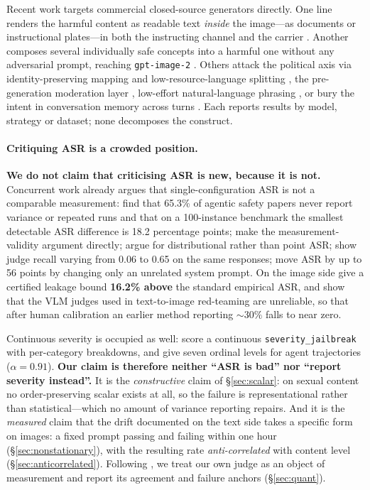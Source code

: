 \documentclass[11pt]{article}
\begin{document}
Recent work targets commercial closed-source generators directly. One line
renders the harmful content as readable text \emph{inside} the image---as
documents or instructional plates---in both the instructing channel and the
carrier \citep{typo,collageattack,etch}. Another composes several individually
safe concepts into a harmful one without any adversarial prompt, reaching
\texttt{gpt-image-2} \citep{twohamsters}. Others attack the political axis via
identity-preserving mapping and low-resource-language splitting \citep{pc2},
the pre-generation moderation layer \citep{mirage}, low-effort natural-language
phrasing \citep{loweffort}, or bury the intent in conversation memory across
turns \citep{inception,semanticchaining}. Each reports results by model,
strategy or dataset; none decomposes the construct.

\paragraph{Critiquing ASR is a crowded position.}
\textbf{We do not claim that criticising ASR is new, because it is not.}
Concurrent work already argues that single-configuration ASR is not a
comparable measurement: \citet{asrisnotanumber} find that 65.3\% of agentic
safety papers never report variance or repeated runs and that on a 100-instance
benchmark the smallest detectable ASR difference is 18.2 percentage points;
\citet{comparisonrequires} make the measurement-validity argument directly;
\citet{singleconfig} argue for distributional rather than point ASR;
\citet{judgecalib} show judge recall varying from 0.06 to 0.65 on the same
responses; \citet{operationalstates} move ASR by up to 56 points by changing
only an unrelated system prompt. On the image side \citet{certifyingunlearning}
give a certified leakage bound \textbf{16.2\% above} the standard empirical
ASR, and \citet{rise} show that the VLM judges used in text-to-image
red-teaming are unreliable, so that after human calibration an earlier method
reporting ${\sim}30\%$ falls to near zero.

Continuous severity is occupied as well: \citet{past2harm} score a continuous
\texttt{severity\_jailbreak} with per-category breakdowns, and
\citet{actiongraded} give seven ordinal levels for agent trajectories
($\alpha=0.91$). \textbf{Our claim is therefore neither ``ASR is bad'' nor
``report severity instead''.} It is the \emph{constructive} claim of
\S\ref{sec:scalar}: on sexual content no order-preserving scalar exists at all,
so the failure is representational rather than statistical---which no amount of
variance reporting repairs. And it is the \emph{measured} claim that the drift
documented on the text side takes a specific form on images: a fixed prompt
passing and failing within one hour (\S\ref{sec:nonstationary}), with the
resulting rate \emph{anti-correlated} with content level
(\S\ref{sec:anticorrelated}). Following \citet{rise}, we treat our own judge as
an object of measurement and report its agreement and failure anchors
(\S\ref{sec:quant}).
\end{document}
